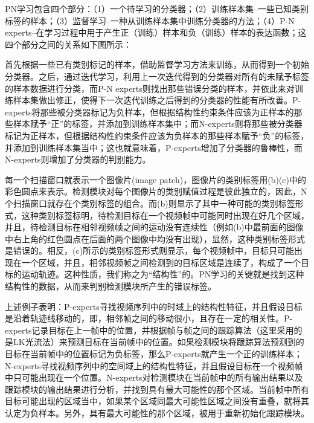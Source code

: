 PN学习包含四个部分：（1）一个待学习的分类器；（2）训练样本集–一些已知类别标签的样本；（3）监督学习–一种从训练样本集中训练分类器的方法；（4）P-N experts–在学习过程中用于产生正（训练）样本和负（训练）样本的表达函数；这四个部分之间的关系如下图所示：

首先根据一些已有类别标记的样本，借助监督学习方法来训练，从而得到一个初始分类器。之后，通过迭代学习，利用上一次迭代得到的分类器对所有的未赋予标签的样本数据进行分类，而P-N experts则找出那些错误分类的样本，并依此来对训练样本集做出修正，使得下一次迭代训练之后得到的分类器的性能有所改善。P-experts将那些被分类器标记为负样本，但根据结构性约束条件应该为正样本的那些样本赋予“正”的标签，并添加到训练样本集中；而N-experts则将那些被分类器标记为正样本，但根据结构性约束条件应该为负样本的那些样本赋予“负”的标签，并添加到训练样本集当中；这也就意味着，P-experts增加了分类器的鲁棒性，而N-experts则增加了分类器的判别能力。

每一个扫描窗口就表示一个图像片(image patch)，图像片的类别标签用(b)(c)中的彩色圆点来表示。检测模块对每个图像片的类别赋值过程是彼此独立的，因此，N个扫描窗口就存在个类别标签的组合。而(b)则显示了其中一种可能的类别标签形式，这种类别标签标明，待检测目标在一个视频帧中可能同时出现在好几个区域，并且，待检测目标在相邻视频帧之间的运动没有连续性（例如(b)中最前面的图像中右上角的红色圆点在后面的两个图像中均没有出现），显然，这种类别标签形式是错误的。相反，(c)所示的类别标签形式则显示，每个视频帧中，目标只可能出现在一个区域，并且，相邻视频帧之间检测到的目标区域是连续了，构成了一个目标的运动轨迹。这种性质，我们称之为“结构性”的。PN学习的关键就是找到这种结构性的数据，从而来判别检测模块所产生的错误标签。

上述例子表明：P-experts寻找视频序列中的时域上的结构性特征，并且假设目标是沿着轨迹线移动的，即，相邻帧之间的移动很小，且存在一定的相关性。P-experts记录目标在上一帧中的位置，并根据帧与帧之间的跟踪算法（这里采用的是LK光流法）来预测目标在当前帧中的位置。如果检测模块将跟踪算法预测到的目标在当前帧中的位置标记为负标签，那么P-experts就产生一个正的训练样本；N-experts寻找视频序列中的空间域上的结构性特征，并且假设目标在一个视频帧中只可能出现在一个位置。N-experts对检测模块在当前帧中的所有输出结果以及跟踪模块的输出结果进行分析，并找到具有最大可能性的那个区域。当前帧中所有目标可能出现的区域当中，如果某个区域同最大可能性区域之间没有重叠，就将其认定为负样本。另外，具有最大可能性的那个区域，被用于重新初始化跟踪模块。

